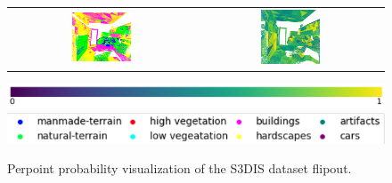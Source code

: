 \begin{figure}[h!]
\begin{tabular}{cc}
            \includegraphics[width=0.33\textwidth, height=0.18\textheight]{images/seg_output/s3dis_DE/office_42.pdf}& 
            \includegraphics[width=0.33\textwidth, height=0.18\textheight]{images/seg_output/s3dis_DE/fout_4.png}\\
        \end{tabular}
        \includegraphics[scale=0.45]{images/prob_legend.pdf}
        \includegraphics[scale=0.65]{images/legend.png}
        \caption{Perpoint probability visualization of the S3DIS dataset flipout.}
        \label{fig:fout_s3dis_probmap}
    \end{figure}

    \FloatBarrier

